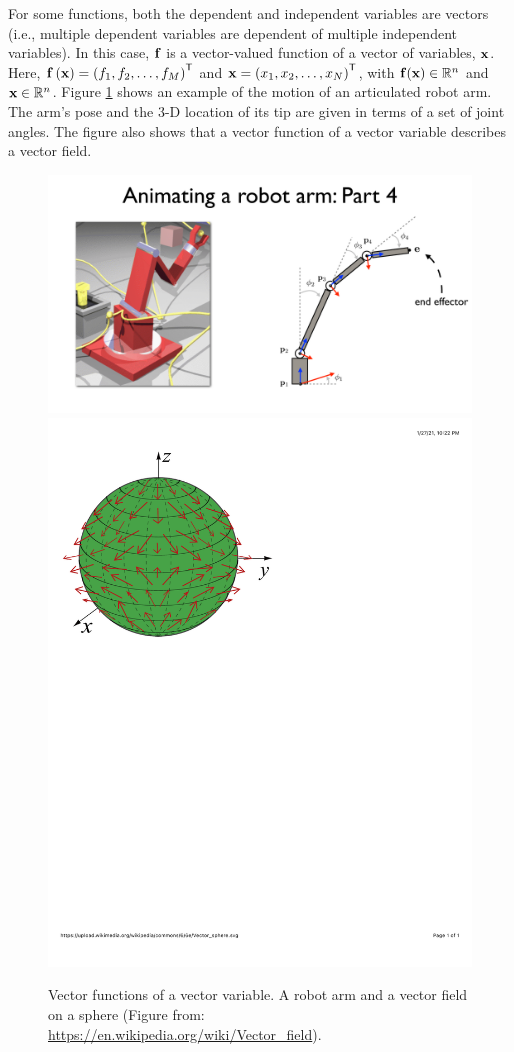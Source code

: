 \documentclass[12pt,letter]{article}
\begin{document}
For some functions, both the dependent and independent variables are vectors (i.e., multiple dependent variables are dependent of multiple independent variables).  In this case, ${\bf f}$ is a vector-valued function of a vector of variables, ${\bf x}$. Here, ${\bf f}\left({\bf x}\right) = \left(f_1, f_2, \hdots, f_M\right)^\mathsf{T}$ and ${\bf x} = \left(x_1, x_2, \hdots, x_N\right)^\mathsf{T}$, with ${\bf f}({\bf x}) \in \mathbb{R}^n$ and ${\bf x} \in \mathbb{R}^n$. Figure \ref{fig_functionType4} shows an example of the motion of an articulated robot arm. The arm's pose  and the 3-D location of its tip are given in terms of a set of joint angles. The figure also shows that a vector function of a vector variable describes a vector field. 
\begin{figure}[H]
	\begin{center}
		{\includegraphics[width=.32\textwidth]{figs/robotArm}}
		{\includegraphics[width=.32\textwidth]{figs/vectorFieldSphere}}				
	\end{center}
	\caption{Vector functions of a vector variable. A robot arm and a vector field on a sphere (Figure from: \url{https://en.wikipedia.org/wiki/Vector_field}).}
	\label{fig_functionType4}
\end{figure}
	
	
\end{document}
